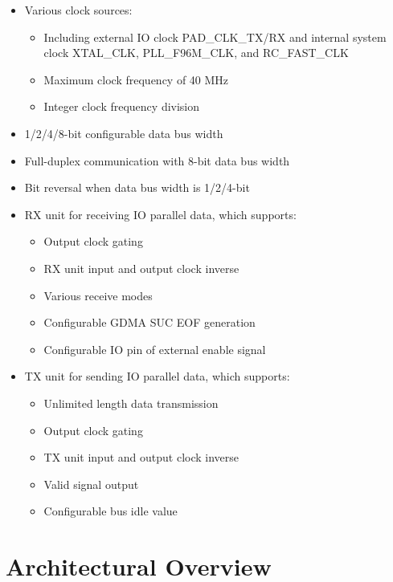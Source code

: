 \documentclass[main\_\_EN.tex]{subfiles}
\begin{document}
\begin{itemize}
    \item Various clock sources:
    \begin{itemize}
        \item Including external IO clock PAD\_CLK\_TX/RX and internal system clock XTAL\_CLK, PLL\_F96M\_CLK, and RC\_FAST\_CLK
        \item Maximum clock frequency of 40 MHz
        \item Integer clock frequency division
    \end{itemize}
    \item 1/2/4/8-bit configurable data bus width
    \item Full-duplex communication with 8-bit data bus width
    \item Bit reversal when data bus width is 1/2/4-bit   
    \item RX unit for receiving IO parallel data, which supports:
    \begin{itemize}
        \item Output clock gating
        \item RX unit input and output clock inverse
        \item Various receive modes
        \item Configurable GDMA SUC EOF generation
        \item Configurable IO pin of external enable signal
    \end{itemize}
    \item TX unit for sending IO parallel data, which supports:
    \begin{itemize}
        \item Unlimited length data transmission
        \item Output clock gating
        \item TX unit input and output clock inverse
        \item Valid signal output
        \item Configurable bus idle value
    \end{itemize}

\end{itemize}


\section{Architectural Overview}
\label{sec:parlio-arch-overview}
\end{document}
